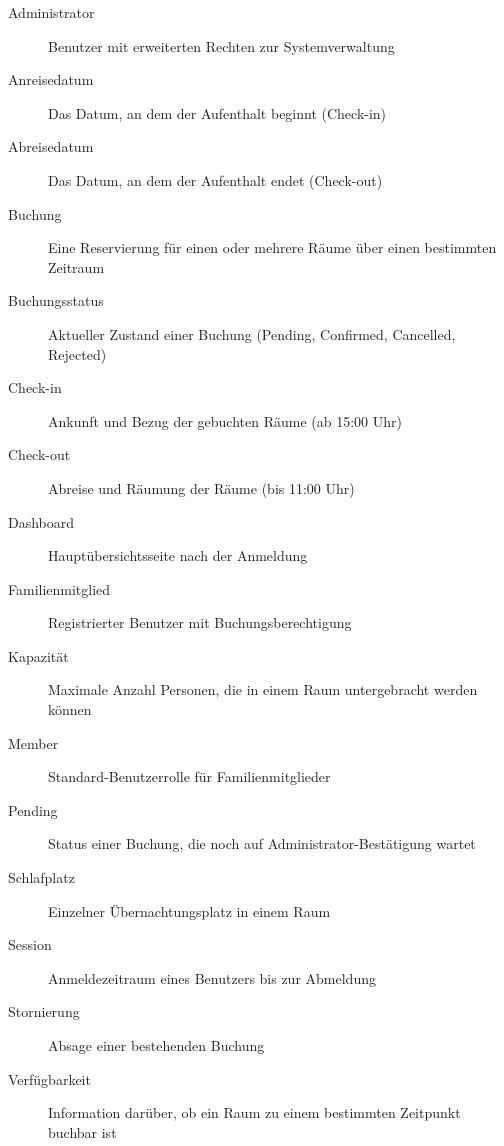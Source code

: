 \begin{description}
    \item[Administrator] Benutzer mit erweiterten Rechten zur Systemverwaltung
    
    \item[Anreisedatum] Das Datum, an dem der Aufenthalt beginnt (Check-in)
    
    \item[Abreisedatum] Das Datum, an dem der Aufenthalt endet (Check-out)
    
    \item[Buchung] Eine Reservierung für einen oder mehrere Räume über einen bestimmten Zeitraum
    
    \item[Buchungsstatus] Aktueller Zustand einer Buchung (Pending, Confirmed, Cancelled, Rejected)
    
    \item[Check-in] Ankunft und Bezug der gebuchten Räume (ab 15:00 Uhr)
    
    \item[Check-out] Abreise und Räumung der Räume (bis 11:00 Uhr)
    
    \item[Dashboard] Hauptübersichtsseite nach der Anmeldung
    
    \item[Familienmitglied] Registrierter Benutzer mit Buchungsberechtigung
    
    \item[Kapazität] Maximale Anzahl Personen, die in einem Raum untergebracht werden können
    
    \item[Member] Standard-Benutzerrolle für Familienmitglieder
    
    \item[Pending] Status einer Buchung, die noch auf Administrator-Bestätigung wartet
    
    \item[Schlafplatz] Einzelner Übernachtungsplatz in einem Raum
    
    \item[Session] Anmeldezeitraum eines Benutzers bis zur Abmeldung
    
    \item[Stornierung] Absage einer bestehenden Buchung
    
    \item[Verfügbarkeit] Information darüber, ob ein Raum zu einem bestimmten Zeitpunkt buchbar ist
\end{description}

